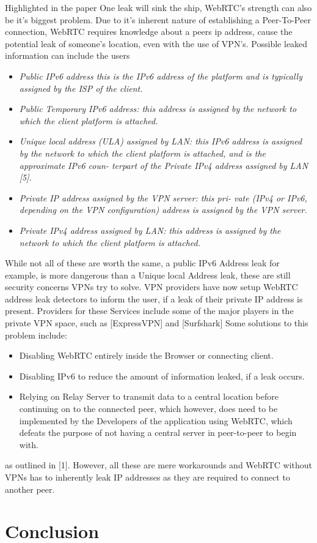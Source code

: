 \documentclass[conference]{IEEEtran}
\begin{document}
Highlighted in the paper One leak will sink the ship, WebRTC's strength can also be it's biggest
problem. Due to it's inherent nature of establishing a Peer-To-Peer connection, WebRTC requires
knowledge about a peers ip address, cause the potential leak of someone's location, even with
the use of VPN's. Possible leaked information can include the users 
\begin{itemize}
    \item \it{Public IPv6 address} this is the IPv6 address of the
    platform and is typically assigned by the ISP of the client.
    \item \it{Public Temporary IPv6 address:} this address is assigned
    by the network to which the client platform is attached.
    \item \it{Unique local address (ULA) assigned by LAN:} this IPv6
    address is assigned by the network to which the client
    platform is attached, and is the approximate IPv6 coun-
    terpart of the Private IPv4 address assigned by LAN [5].
    \item \it{Private IP address assigned by the VPN server:} this pri-
    vate (IPv4 or IPv6, depending on the VPN conﬁguration)
    address is assigned by the VPN server.
    \item \it{Private IPv4 address assigned by LAN:} this address is 
    assigned by the network to which the client platform is
    attached.
  \end{itemize} %
While not all of these are worth the same, a public IPv6 Address leak for example, is more dangerous than a
Unique local Address leak, these are still security concerns VPNs try to solve.
VPN providers have now setup WebRTC address leak detectors to inform the user, if a leak of their private IP address
is present. Providers for these Services include some of the major players in the private VPN space, such as 
[ExpressVPN] and [Surfshark] %
Some solutions to this problem include:
\begin{itemize}
    \item Disabling WebRTC entirely inside the Browser or connecting client.
    \item Disabling IPv6 to reduce the amount of information leaked, if a leak occurs.
    \item Relying on Relay Server to transmit data to a central location before continuing on to the connected peer,
    which however, does need to be implemented by the Developers of the application using WebRTC, which defeats the
    purpose of not having a central server in peer-to-peer to begin with.
\end{itemize} %
as outlined in [1].
However, all these are mere workarounds and WebRTC without VPNs has to inherently leak
IP addresses as they are required to connect to another peer.


\section{Conclusion}

\begin{thebibliography}{00}
\end{thebibliography}
\end{document}
